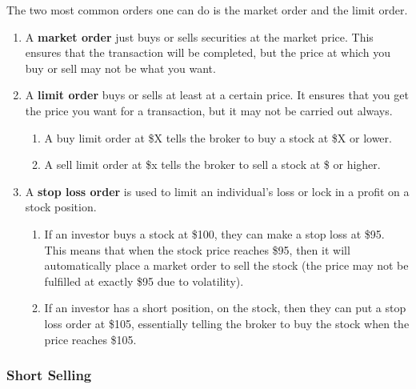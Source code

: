 \documentclass{article}
\begin{document}
    \begin{definition}
      The two most common orders one can do is the market order and the limit order. 
      \begin{enumerate}
        \item A \textbf{market order} just buys or sells securities at the market price. This ensures that the transaction will be completed, but the price at which you buy or sell may not be what you want. 
        \item A \textbf{limit order} buys or sells at least at a certain price. It ensures that you get the price you want for a transaction, but it may not be carried out always. 
        \begin{enumerate}
          \item A buy limit order at \$X tells the broker to buy a stock at \$X or lower. 
          \item A sell limit order at \$x tells the broker to sell a stock at \$ or higher. 
        \end{enumerate}
        \item A \textbf{stop loss order} is used to limit an individual's loss or lock in a profit on a stock position. 
        \begin{enumerate}
          \item If an investor buys a stock at \$100, they can make a stop loss at \$95. This means that when the stock price reaches \$95, then it will automatically place a market order to sell the stock (the price may not be fulfilled at exactly \$95 due to volatility). 
          \item If an investor has a short position, on the stock, then they can put a stop loss order at \$105, essentially telling the broker to buy the stock when the price reaches \$105. 
        \end{enumerate}
      \end{enumerate}
    \end{definition}

    \subsubsection{Short Selling}
\end{document}
